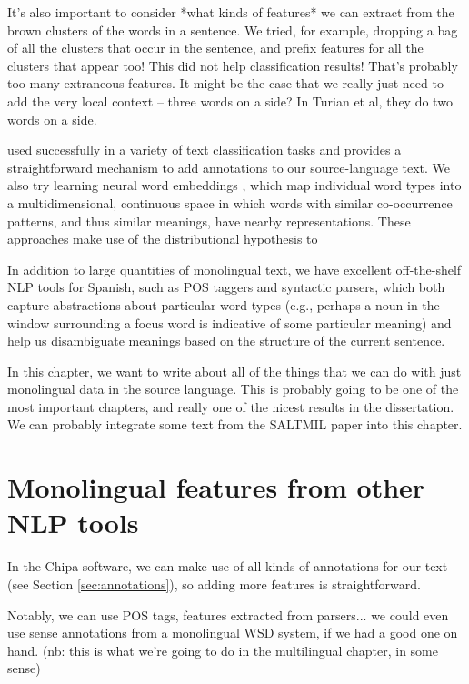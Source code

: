 It's also important to consider *what kinds of features* we can extract from
the brown clusters of the words in a sentence. We tried, for example, dropping
a bag of all the clusters that occur in the sentence, and prefix features for
all the clusters that appear too! This did not help classification results!
That's probably too many extraneous features.
It might be the case that we really just need to add the very local context --
three words on a side? In Turian et al, they do two words on a side.


used successfully in a variety of text classification tasks
and provides a straightforward mechanism
to add annotations to our source-language text.  We also try learning neural
word embeddings \cite{mikolovword2vec}, which map individual word types into a
multidimensional, continuous space in which words with similar co-occurrence
patterns, and thus similar meanings, have nearby representations.
These approaches make use of the distributional hypothesis to 


In addition to large quantities of monolingual text, we have excellent
off-the-shelf NLP tools for Spanish, such as POS taggers and syntactic parsers,
which both capture abstractions about particular word types (e.g., perhaps a
noun in the window surrounding a focus word is indicative of some particular
meaning) and help us disambiguate meanings based on the structure of the
current sentence.


In this chapter, we want to write about all of the things that we can do with
just monolingual data in the source language.
This is probably going to be one of the most important chapters, and really one
of the nicest results in the dissertation.
We can probably integrate some text from the SALTMIL paper into this chapter.


\section{Monolingual features from other NLP tools}
In the Chipa software, we can make use of all kinds of annotations for our
text (see Section \ref{sec:annotations}), so adding more features is
straightforward.

Notably, we can use POS tags, features extracted from parsers... we could even
use sense annotations from a monolingual WSD system, if we had a good one on
hand. (nb: this is what we're going to do in the multilingual chapter, in some
sense)

